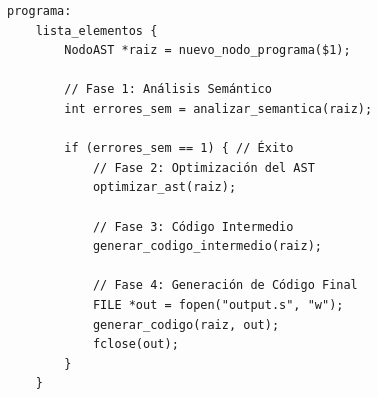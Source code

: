 \begin{lstlisting}[style=cstyle, caption={Orquestación del pipeline en parser.y}]
programa:
    lista_elementos {
        NodoAST *raiz = nuevo_nodo_programa($1);
        
        // Fase 1: Análisis Semántico
        int errores_sem = analizar_semantica(raiz);
        
        if (errores_sem == 1) { // Éxito
            // Fase 2: Optimización del AST
            optimizar_ast(raiz);
            
            // Fase 3: Código Intermedio
            generar_codigo_intermedio(raiz);
            
            // Fase 4: Generación de Código Final
            FILE *out = fopen("output.s", "w");
            generar_codigo(raiz, out);
            fclose(out);
        }
    }
\end{lstlisting}
